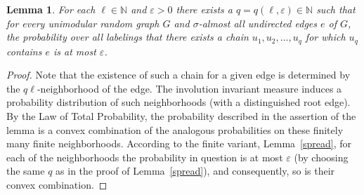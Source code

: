 \documentclass[12pt,a4paper]{article}
\newtheorem{Lemma}[Theorem]{Lemma}
\newcommand{\eps}{\varepsilon}
\renewcommand{\:}{\colon}
\begin{document}
\begin{Lemma} \label{spreaduni}
For each $\ell \in \mathbb{N}$ and $\eps > 0$ there exists a $q = q(\ell, \eps) \in \mathbb{N}$ such that for every unimodular random graph $G$ and $\sigma$-almost all undirected edges $e$ of $G$, the probability over all labelings that there exists a chain $u_1, u_2, \ldots, u_q$ for which $u_q$ contains $e$ is at most $\eps$.
\end{Lemma}
\begin{proof}
Note that the existence of such a chain for a given edge is determined by the $q\ell$-neighborhood of the edge. 
The involution invariant measure induces a probability distribution of such neighborhoods (with a distinguished root edge). 
By the Law of Total Probability, the probability described in the assertion of the lemma is a convex combination of the analogous probabilities on these finitely many finite neighborhoods. 
According to the finite variant, Lemma~\ref{spread}, for each of the neighborhoods the probability in question is at most $\eps$ (by choosing the same $q$ as in the proof of Lemma~\ref{spread}), and consequently, so is their convex combination. 
\end{proof}
\end{document}

